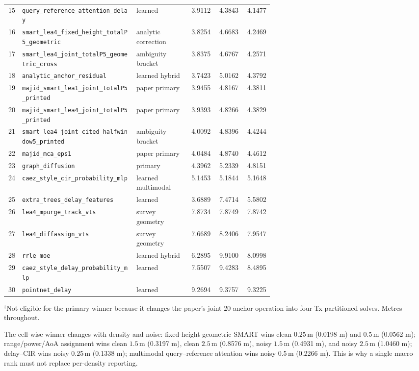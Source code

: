 \documentclass[10pt]{article}
\newcommand{\code}[1]{\nolinkurl{#1}}
\newcommand{\m}{\,\mathrm m}
\begin{document}
\begin{longtable}{@{}r p{0.43\linewidth}p{0.20\linewidth}rrr@{}}
15 & \code{query_reference_attention_delay} & learned & 3.9112 & 4.3843 & 4.1477\\
16 & \code{smart_lea4_fixed_height_totalP5_geometric} & analytic correction & 3.8254 & 4.6683 & 4.2469\\
17 & \code{smart_lea4_joint_totalP5_geometric_cross} & ambiguity bracket & 3.8375 & 4.6767 & 4.2571\\
18 & \code{analytic_anchor_residual} & learned hybrid & 3.7423 & 5.0162 & 4.3792\\
19 & \code{majid_smart_lea1_joint_totalP5_printed} & paper primary & 3.9455 & 4.8167 & 4.3811\\
20 & \code{majid_smart_lea4_joint_totalP5_printed} & paper primary & 3.9393 & 4.8266 & 4.3829\\
21 & \code{smart_lea4_joint_cited_halfwindow5_printed} & ambiguity bracket & 4.0092 & 4.8396 & 4.4244\\
22 & \code{majid_mca_eps1} & paper primary & 4.0484 & 4.8740 & 4.4612\\
23 & \code{graph_diffusion} & primary & 4.3962 & 5.2339 & 4.8151\\
24 & \code{caez_style_cir_probability_mlp} & learned multimodal & 5.1453 & 5.1844 & 5.1648\\
25 & \code{extra_trees_delay_features} & learned & 3.6889 & 7.4714 & 5.5802\\
26 & \code{lea4_mpurge_track_vts} & survey geometry & 7.8734 & 7.8749 & 7.8742\\
27 & \code{lea4_diffassign_vts} & survey geometry & 7.6689 & 8.2406 & 7.9547\\
28 & \code{rrle_moe} & learned hybrid & 6.2895 & 9.9100 & 8.0998\\
29 & \code{caez_style_delay_probability_mlp} & learned & 7.5507 & 9.4283 & 8.4895\\
30 & \code{pointnet_delay} & learned & 9.2694 & 9.3757 & 9.3225\\
\bottomrule
\end{longtable}
\normalsize

$^\dagger$Not eligible for the primary winner because it changes the paper's joint
20-anchor operation into four Tx-partitioned solves.  Metres throughout.

The cell-wise winner changes with density and noise: fixed-height geometric
SMART wins clean $0.25\m$ (0.0198 m) and $0.5\m$ (0.0562 m);
range/power/AoA assignment wins clean $1.5\m$ (0.3197 m), clean $2.5\m$
(0.8576 m), noisy $1.5\m$ (0.4931 m), and noisy $2.5\m$ (1.0460 m);
delay--CIR wins noisy $0.25\m$ (0.1338 m); multimodal query--reference
attention wins noisy $0.5\m$ (0.2266 m).  This is why a single macro rank must
not replace per-density reporting.
\end{document}
